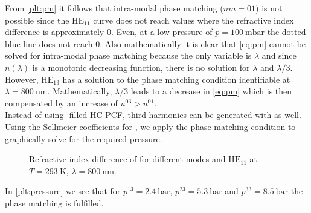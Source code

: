 \documentclass[fleqn, 10pt, twocolumn]{SelfArx}
\begin{document}
    From \autoref{plt:pm} it follows that intra-modal phase matching ($nm = 01$) is not possible since the $\text{HE}_{11}$ curve does not reach values where the refractive index difference is approximately 0.
    Even, at a low pressure of $p=\SI{100}{\milli\bar}$ the dotted blue line does not reach 0. 
    Also mathematically it is clear that \eqref{eq:pm} cannot be solved for intra-modal phase matching because the only variable is $\lambda$ and since $n(\lambda)$ is a monotonic decreasing function, there is no solution for $\lambda$ and $\lambda/3$. 
    However, $\text{HE}_{13}$ has a solution to the phase matching condition identifiable at $\lambda=\SI{800}{\nano\meter}$.
    Mathematically, $\lambda/3$ leads to a decrease in \eqref{eq:pm} which is then compensated by an increase of $u^{03}>u^{01}$.\\
    Instead of using -filled HC-PCF, third harmonics can be generated with  as well. 
    Using the Sellmeier coefficients for , we apply the phase matching condition to 
    graphically solve for the required pressure.
    \begin{figure}[h]
        \centering
        \caption{Refractive index difference of  for different  modes and $\text{HE}_{11}$ at $T=\SI{293}{\kelvin}$,  $\lambda=\SI{800}{\nano\meter}$.}
        \label{plt:pressure}
    \end{figure}
    In \autoref{plt:pressure} we see that for $p^{13}=\SI{2.4}{\bar}$, $p^{23}=\SI{5.3}{\bar}$ and $p^{33}=\SI{8.5}{\bar}$ the phase matching is fulfilled. 
\end{document}

